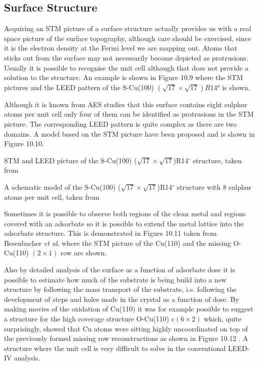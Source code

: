 \subsection{Surface Structure}
Acquiring an STM picture of a surface structure actually provides us with a real space picture of the surface topography, although care should be exercised, since it is the electron density at the Fermi level we are mapping out. Atoms that sticks out from the surface may  not necessarily become depicted as protrusions. Usually it is possible to recognise the unit cell although that does not provide a solution to the structure. An example is shown in Figure 10.9 where the STM pictures and the LEED pattern of the S-Cu(100) $(\sqrt{17}\times\sqrt{17})R\ang{14}$ is shown.

Although it is known from AES studies that this surface contains eight sulphur atoms per unit cell only four of them can be identified as protrusions in the STM picture. The corresponding LEED pattern is quite complex as there are two domains. A model based on the STM picture have been proposed and is shown in Figure 10.10. 

\vspace*{9cm}

 STM and LEED picture of the S-Cu(100) ($\sqrt{17} \times \sqrt{17}$)R14$^\circ$ structure, taken from \cite{Luigi}

\vspace*{9cm}

 A schematic model of the S-Cu(100) ($\sqrt{17} \times \sqrt{17}$)R14$^\circ$ structure with 8 sulphur atoms per unit cell, taken from \cite{Luigi}

\vspace{1cm} 

Sometimes it is possible to observe both regions of the clean metal and regions covered with an adsorbate so it is possible to extend the metal lattice into the adsorbate structure. This is demonstrated in Figure 10.11 taken from Besenbacher \textit{et al}. \cite{Besenbacher1} where the STM picture of the Cu(110) and the missing O-Cu(110) $(2\times 1)$ row are shown. 

\vspace*{11cm}


\vspace{1cm} 

Also by detailed analysis of the surface as a function of adsorbate dose it is possible to estimate how much of the substrate is being build into a new structure by following the mass transport of the substrate, i.e. following the  development of steps and holes made in the crystal as a function of dose. By making movies of the oxidation of Cu(110) it was for example possible to suggest a structure for the high coverage structure O-Cu(110) c$(6\times 2)$ which, quite surprisingly, showed that Cu atoms were sitting highly uncoordinated on top of the previously formed missing row reconstructions as shown in Figure 10.12 \cite{Besenbacher1}. A structure where the unit cell is very difficult to solve in the conventional LEED-IV analysis.

